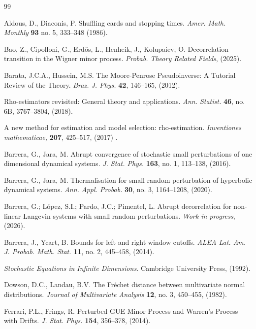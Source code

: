 \documentclass[12pt,thmsa]{article}
\begin{document}
\begin{thebibliography}{99}
	
		
 {\sc Aldous, D., Diaconis, P.} Shuﬄing cards and stopping times. {\it Amer. Math. Monthly} {\bf 93} no. 5, 333--348 (1986).	

 {\sc Bao, Z., Cipolloni, G., Erd\H{o}s, L., Henheik, J., Kolupaiev, O.} Decorrelation transition in the Wigner minor process.
{\it Probab. Theory Related Fields}, (2025).
	
 {\sc Barata, J.C.A., Hussein, M.S.} The Moore-Penrose Pseudoinverse: A Tutorial Review of the Theory. {\it Braz. J. Phys.} {\bf 42}, 146--165, (2012).

 Rho-estimators revisited: General theory and applications. {\it  Ann. Statist.} { \bf 46}, no. 6B, 3767--3804, (2018).

 A new method for estimation and model selection: rho-estimation. {\it Inventiones mathematicae,} {\bf 207}, 425--517, (2017) .

 {\sc Barrera, G.,  Jara, M.} Abrupt convergence of stochastic small perturbations of one dimensional dynamical systems. {\it J. Stat. Phys.} {\bf 163},  no. 1, 113--138, (2016).

 {\sc Barrera, G.,  Jara, M.} Thermalisation for small random perturbation of hyperbolic dynamical systems. {\it Ann. Appl. Probab.}  {\bf 30},  no. 3, 1164--1208, (2020).

 {\sc Barrera, G.; L\'opez, S.I.; Pardo, J.C.; Pimentel, L.} Abrupt decorrelation for non-linear Langevin systems with small random perturbations. {\it Work in progress},  (2026).

 {\sc Barrera, J., Ycart, B.} Bounds for left and right window cutoffs. {\it  ALEA Lat. Am. J. Probab. Math. Stat.} {\bf 11}, no. 2, 445--458, (2014).

 {\it Stochastic Equations in Infinite Dimensions.} Cambridge University Press, (1992).

 {\sc  Dowson, D.C., Landau, B.V.} The Fr\'echet distance between multivariate normal distributions. {\it Journal of Multivariate Analysis} {\bf 12}, no. 3, 450--455, (1982).

 {\sc Ferrari, P.L., Frings, R.} Perturbed GUE Minor Process and Warren's Process with Drifts. {\it J. Stat. Phys.} {\bf 154}, 356--378, (2014).


\end{thebibliography}
\end{document}
